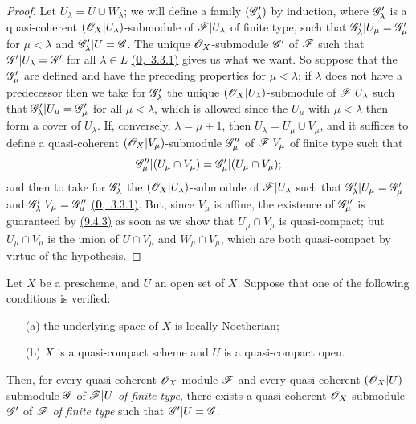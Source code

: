 \begin{proof}
\label{proof-lem-1.9.4.6}
Let $U_\lambda=U\cup W_\lambda$; we will define a family $(\mathscr{G}'_\lambda)$ by induction,
where $\mathscr{G}'_\lambda$ is a quasi-coherent $(\mathscr{O}_X|U_\lambda)$-submodule of
$\mathscr{F}|U_\lambda$ of finite type, such that $\mathscr{G}'_\lambda|U_\mu=\mathscr{G}'_\mu$ for
$\mu<\lambda$ and $\mathscr{G}'_\lambda|U=\mathscr{G}$. The unique $\mathscr{O}_X$-submodule $\mathscr{G}'$ of
$\mathscr{F}$ such that $\mathscr{G}'|U_\lambda=\mathscr{G}'$ for all $\lambda\in L$ \hyperref[env-0.3.3.1]{(\textbf{0},~3.3.1)} gives
us what we want. So suppose that the $\mathscr{G}'_\mu$ are defined and have the preceding
properties for $\mu<\lambda$; if $\lambda$ does not have a predecessor then we take for
$\mathscr{G}'_\lambda$ the unique $(\mathscr{O}_X|U_\lambda)$-submodule of $\mathscr{F}|U_\lambda$ such that
$\mathscr{G}'_\lambda|U_\mu=\mathscr{G}'_\mu$ for all $\mu<\lambda$, which is allowed since the $U_\mu$
with $\mu<\lambda$ then form a cover of $U_\lambda$. If, conversely, $\lambda=\mu+1$, then
$U_\lambda=U_\mu\cup V_\mu$, and it suffices to define a quasi-coherent
$(\mathscr{O}_X|V_\mu)$-submodule $\mathscr{G}''_\mu$ of $\mathscr{F}|V_\mu$ of finite type such that
\[
  \mathscr{G}''_\mu|(U_\mu\cap V_\mu)=\mathscr{G}'_\mu|(U_\mu\cap V_\mu);
\]
and then to take for $\mathscr{G}'_\lambda$ the $(\mathscr{O}_X|U_\lambda)$-submodule of
$\mathscr{F}|U_\lambda$ such that $\mathscr{G}'_\lambda|U_\mu=\mathscr{G}'_\mu$ and
$\mathscr{G}'_\lambda|V_\mu=\mathscr{G}''_\mu$ \hyperref[env-0.3.3.1]{(\textbf{0},~3.3.1)}. But, since $V_\mu$ is affine, the
existence of $\mathscr{G}''_\mu$ is guaranteed by \hyperref[cor-1.9.4.3]{(9.4.3)} as soon as we show that
$U_\mu\cap V_\mu$ is quasi-compact; but $U_\mu\cap V_\mu$ is the union of $U\cap V_\mu$ and
$W_\mu\cap V_\mu$, which are both quasi-compact by virtue of the hypothesis.
\end{proof}

\begin{thm}[9.4.7]
\label{thm-1.9.4.7}
Let $X$ be a prescheme, and $U$ an open set of $X$. Suppose that one of the following
conditions is verified:
\begin{itemize}
  \item[{\rm(a)}] the underlying space of $X$ is locally Noetherian;
  \item[{\rm(b)}] $X$ is a quasi-compact scheme and $U$ is a quasi-compact open.
\end{itemize}
Then, for every quasi-coherent $\mathscr{O}_X$-module $\mathscr{F}$ and every quasi-coherent
$(\mathscr{O}_X|U)$-submodule $\mathscr{G}$ of $\mathscr{F}|U$ {\em of finite type}, there exists a
quasi-coherent $\mathscr{O}_X$-submodule $\mathscr{G}'$ of $\mathscr{F}$ {\em of finite type} such that
$\mathscr{G}'|U=\mathscr{G}$.
\end{thm}

